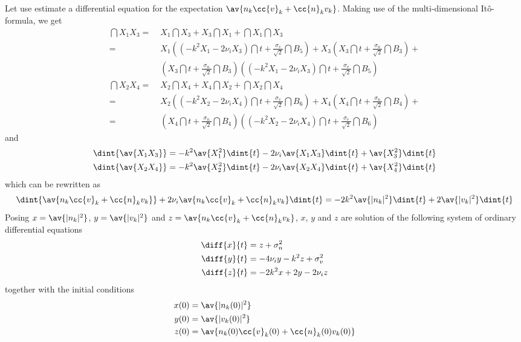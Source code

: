 \documentclass[10pt,a4paper]{article}
\begin{document}
Let use estimate a differential equation for the expectation 
$\av{n_k\cc{v}_k+\cc{n}_kv_k}$. Making use of the multi-dimensional
It\^o-formula, we get
\begin{align}
\dint{X_1X_3}=&\;X_1\dint{X_3}+X_3\dint{X_1}+\dint{X_1}\dint{X_3}\nonumber\\
= &\;
X_1\left(\left(-k^2X_1-2\nu_iX_3\right)\dint{t}+
\frac{\sigma_v}{\sqrt{2}}\dint{B_5}\right)+
X_3\left(X_3\dint{t}+\frac{\sigma_n}{\sqrt{2}}\dint{B_3}\right)+\nonumber\\
&\; \left(X_3\dint{t}+\frac{\sigma_n}{\sqrt{2}}\dint{B_3}\right)
\left(\left(-k^2X_1-2\nu_iX_3\right)\dint{t}+
\frac{\sigma_v}{\sqrt{2}}\dint{B_5}\right)\nonumber\\
\dint{X_2X_4}=&\;X_2\dint{X_4}+X_4\dint{X_2}+\dint{X_2}\dint{X_4}\nonumber\\
= &\;
X_2\left(\left(-k^2X_2-2\nu_iX_4\right)\dint{t}+
\frac{\sigma_v}{\sqrt{2}}\dint{B_6}\right)+
X_4\left(X_4\dint{t}+\frac{\sigma_n}{\sqrt{2}}\dint{B_4}\right)+\nonumber\\
= &\;\left(X_4\dint{t}+\frac{\sigma_n}{\sqrt{2}}\dint{B_4}\right)
\left(\left(-k^2X_2-2\nu_iX_4\right)\dint{t}+
\frac{\sigma_v}{\sqrt{2}}\dint{B_6}\right)\nonumber
\end{align}
and
\begin{align}
\dint{\av{X_1X_3}}=-k^2\av{X_1^2}\dint{t}-2\nu_i\av{X_1X_3}\dint{t}+
\av{X_3^2}\dint{t}\nonumber\\
\dint{\av{X_2X_4}}=-k^2\av{X_2^2}\dint{t}-2\nu_i\av{X_2X_4}\dint{t}+
\av{X_4^2}\dint{t}\nonumber
\end{align}
which can be rewritten as
\begin{align}
\dint{\av{n_k\cc{v}_k+\cc{n}_kv_k}}+2\nu_i\av{n_k\cc{v}_k+\cc{n}_kv_k}\dint{t}
=-2k^2\av{|n_k|^2}\dint{t}+2\av{|v_k|^2}\dint{t}
\end{align}
Posing $x=\av{|n_k|^2}$, $y=\av{|v_k|^2}$ and
$z=\av{n_k\cc{v}_k+\cc{n}_kv_k}$, $x$, $y$ and $z$ are solution of the
following system of ordinary differential equations
\begin{align}
\diff{x}{t}&=z+\sigma_n^2\\
\diff{y}{t}&=-4\nu_iy-k^2z+\sigma_v^2\\
\diff{z}{t}&=-2k^2x+2y-2\nu_iz
\end{align}
together with the initial conditions
\begin{align}
x(0)&=\av{|n_k(0)|^2}\\
y(0)&=\av{|v_k(0)|^2}\\
z(0)&=\av{n_k(0)\cc{v}_k(0)+\cc{n}_k(0)v_k(0)}
\end{align}
\end{document}
